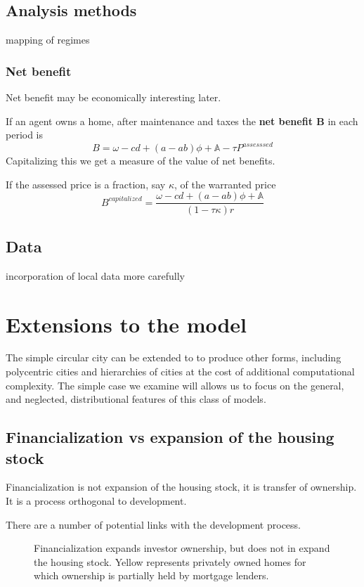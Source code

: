 \subsection{Analysis methods}
mapping of regimes

\subsubsection{Net benefit}
Net benefit may be economically interesting later.

If an agent owns a home, after maintenance and taxes the \textbf{net benefit B} in each period is 
\[B= \omega-cd +(a-ab)\phi +\mathbb{A} - \tau P^{assesssed}\]
Capitalizing this we get a measure of the value of net benefits.

If the assessed price is a fraction, say $\kappa$, of the warranted price
\[B^{capitalized}=\frac{\omega-cd +(a-ab)\phi + \mathbb{A}}{(1- \tau\kappa)r}\]


\subsection{Data}
incorporation of local data more carefully

\section{Extensions to the model}
The simple circular city can be extended to to produce other forms, including polycentric cities and hierarchies of cities at the cost of additional computational complexity. The simple case we examine will allows us to focus on the general, and neglected, distributional features of this class of models.

\subsection{Financialization vs expansion of the housing stock}

Financialization is not expansion of the housing stock, it is transfer of ownership. It is a process orthogonal to development.

There are a number of potential links with the development process.

\begin{figure}
\begin{center}

\end{center}
\caption{Financialization expands investor ownership, but does not in expand the housing stock. Yellow represents privately owned homes for which ownership is partially held by mortgage lenders.}
\label{fig-financialization-expansion}
\end{figure}


